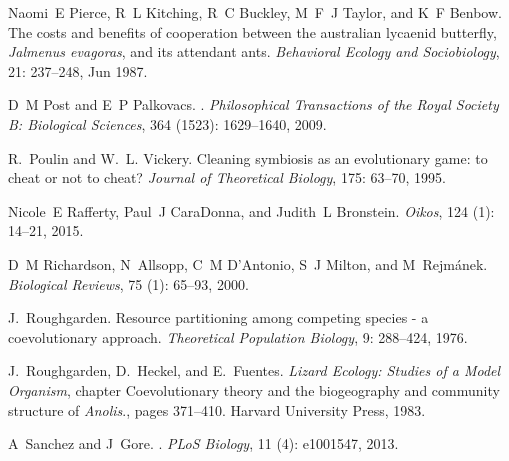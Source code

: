 \documentclass[12pt]{article}
\begin{document}
\begin{thebibliography}{61}
Naomi~E Pierce, R~L Kitching, R~C Buckley, M~F~J Taylor, and K~F Benbow.
\newblock The costs and benefits of cooperation between the australian lycaenid
  butterfly, \textit{Jalmenus evagoras}, and its attendant ants.
\newblock \emph{Behavioral Ecology and Sociobiology}, 21: 237--248,
  Jun 1987.

D~M Post and E~P Palkovacs.
.
\newblock \emph{Philosophical Transactions of the Royal Society B: Biological
  Sciences}, 364 (1523): 1629--1640, 2009.

R.~Poulin and W.~L. Vickery.
\newblock Cleaning symbiosis as an evolutionary game: to cheat or not to cheat?
\newblock \emph{Journal of Theoretical Biology}, 175: 63--70, 1995.

Nicole~E Rafferty, Paul~J CaraDonna, and Judith~L Bronstein.
\newblock \emph{Oikos}, 124 (1): 14--21, 2015.

D~M Richardson, N~Allsopp, C~M D'Antonio, S~J Milton, and M~Rejm{\'a}nek.
\newblock \emph{Biological Reviews}, 75 (1): 65--93, 2000.

J.~Roughgarden.
\newblock Resource partitioning among competing species - a coevolutionary
  approach.
\newblock \emph{Theoretical Population Biology}, 9: 288--424, 1976.

J.~Roughgarden, D.~Heckel, and E.~Fuentes.
\newblock \emph{Lizard Ecology: Studies of a Model Organism}, chapter
  Coevolutionary theory and the biogeography and community structure of
  {\it{Anolis}}., pages 371--410.
\newblock Harvard University Press, 1983.

A~Sanchez and J~Gore.
.
\newblock \emph{PLoS Biology}, 11 (4): e1001547, 2013.


\end{thebibliography}
\end{document}
